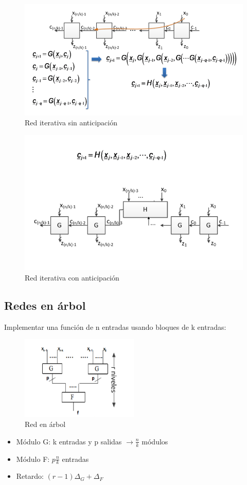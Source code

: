 \begin{figure}[H]
	\centering
	\includegraphics[width=\textwidth]{images/Tema_3/Redes_Anticipacion_1.PNG}
	\caption{Red iterativa sin anticipación}
\end{figure}
\begin{figure}[H]
	\centering
	\includegraphics[width=\textwidth]{images/Tema_3/Redes_Anticipacion_2.PNG}
	\caption{Red iterativa con anticipación}
\end{figure}
\newpage
\subsection{Redes en árbol}
Implementar una función de n entradas usando bloques de k entradas:
\begin{figure}[H]
	\centering
	\includegraphics[width=0.5\textwidth]{images/Tema_3/Red_Arbol.PNG}
	\caption{Red en árbol}
\end{figure}
\begin{itemize}
	\item Módulo G: k entradas y p salidas $\rightarrow \frac{n}{k}$ módulos
	\item Módulo F: $p\frac{n}{k}$ entradas
	\item Retardo: $\left(r - 1\right)\Delta_{G} + \Delta_{F}$
\end{itemize}

